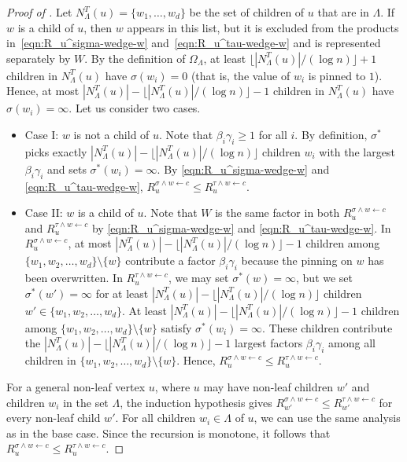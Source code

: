 \documentclass[11pt]{amsart}
\newcommand{\nbd}[2]{N_{#1}^{#2}}
\theoremstyle{definition}
\theoremstyle{remark}
\begin{document}
\begin{proof}[Proof of ]
Let $\nbd{\Lambda}{T}(u)=\{w_1,\ldots,w_d\}$ be the set of children of $u$ that are in $\Lambda$.
If $w$ is a child of $u$, then $w$ appears in this list, but it is excluded from the products in~\eqref{eqn:R_u^sigma-wedge-w} and~\eqref{eqn:R_u^tau-wedge-w} and is represented separately by $W$.
By the definition of $\Omega_\Lambda$, at least $\lfloor |N^T_\Lambda(u)|/(\log n) \rfloor + 1$ children in $\nbd{\Lambda}{T}(u)$ have $\sigma(w_i) = 0$ (that is, the value of $w_i$ is pinned to $1$). Hence, at most $|N_\Lambda^T(u)| - \lfloor |N^T_\Lambda(u)|/(\log n) \rfloor - 1$ children in $\nbd{\Lambda}{T}(u)$ have $\sigma(w_i) = \infty$.
Let us consider two cases.
\begin{itemize}
  \item Case I: $w$ is not a child of $u$. Note that $\beta_i \gamma_i \geq 1$ for all $i$. By definition, $\sigma^*$ picks exactly $|N_\Lambda^T(u)| - \lfloor |N^T_\Lambda(u)|/(\log n) \rfloor$ children $w_i$ with the largest $\beta_i \gamma_i$ and sets $\sigma^*(w_i) = \infty$. By \eqref{eqn:R_u^sigma-wedge-w} and \eqref{eqn:R_u^tau-wedge-w}, $R^{\sigma \land w \gets c}_u \leq R^{\tau \land w \gets c}_u$.
    \item Case II: $w$ is a child of $u$. Note that $W$ is the same factor in both $R^{\sigma \land w \gets c}_u$ and $R^{\tau\land w \gets c}_u$ by \eqref{eqn:R_u^sigma-wedge-w} and \eqref{eqn:R_u^tau-wedge-w}. In $R^{\sigma \land w \gets c}_u$, at most $|N_\Lambda^T(u)| - \lfloor |N^T_\Lambda(u)|/(\log n) \rfloor - 1$ children among $\{w_1,w_2,\ldots,w_d\} \setminus \{w\}$ contribute a factor $\beta_i\gamma_i$ because the pinning on $w$ has been overwritten. In $R^{\tau \land w \gets c}_u$, we may set $\sigma^*(w) = \infty$, but we set $\sigma^*(w') = \infty$ for at least $|\nbd{\Lambda}{T}(u)| - \lfloor |N^T_\Lambda(u)|/(\log n) \rfloor$ children $w' \in \{w_1,w_2,\ldots,w_d\}$. At least $|\nbd{\Lambda}{T}(u)| - \lfloor |N^T_\Lambda(u)|/(\log n) \rfloor-1$ children among $\{w_1,w_2,\ldots,w_d\} \setminus \{w\}$ satisfy $\sigma^*(w_i) = \infty$. These children contribute the $|\nbd{\Lambda}{T}(u)| - \lfloor |N^T_\Lambda(u)|/(\log n) \rfloor-1$ largest factors $\beta_i \gamma_i$ among all children in $\{w_1,w_2,\ldots,w_d\} \setminus \{w\}$. Hence, $R^{\sigma \land w \gets c}_u \leq R^{\tau \land w \gets c}_u$.
\end{itemize}


For a general non-leaf vertex $u$, where $u$ may have non-leaf children $w'$ and children $w_i$ in the set $\Lambda$, the induction hypothesis gives $R^{\sigma \land w \gets c}_{w'} \leq R^{\tau \land w \gets c}_{w'}$ for every non-leaf child $w'$. For all children $w_i \in \Lambda$ of $u$, we can use the same analysis as in the base case. Since the recursion is monotone, it follows that $R^{\sigma \land w \gets c}_u \leq R^{\tau \land w \gets c}_u$.
\end{proof}
\end{document}
